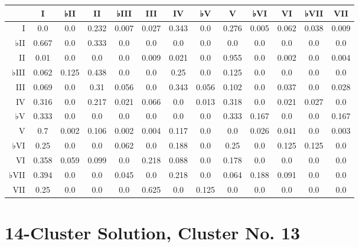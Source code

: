\begin{table}[htbp]
\begin{minipage}{\linewidth}
\setlength{\tymax}{0.5\linewidth}
\centering
\small
\begin{tabulary}{\textwidth}{@{}RCCCCCCCCCCCC@{}} \toprule
&I&♭II&II&♭III&III&IV&♭V&V&♭VI&VI&♭VII&VII\\
\midrule
I&0.0&0.0&0.232&0.007&0.027&0.343&0.0&0.276&0.005&0.062&0.038&0.009\\
♭II&0.667&0.0&0.333&0.0&0.0&0.0&0.0&0.0&0.0&0.0&0.0&0.0\\
II&0.01&0.0&0.0&0.0&0.009&0.021&0.0&0.955&0.0&0.002&0.0&0.004\\
♭III&0.062&0.125&0.438&0.0&0.0&0.25&0.0&0.125&0.0&0.0&0.0&0.0\\
III&0.069&0.0&0.31&0.056&0.0&0.343&0.056&0.102&0.0&0.037&0.0&0.028\\
IV&0.316&0.0&0.217&0.021&0.066&0.0&0.013&0.318&0.0&0.021&0.027&0.0\\
♭V&0.333&0.0&0.0&0.0&0.0&0.0&0.0&0.333&0.167&0.0&0.0&0.167\\
V&0.7&0.002&0.106&0.002&0.004&0.117&0.0&0.0&0.026&0.041&0.0&0.003\\
♭VI&0.25&0.0&0.0&0.062&0.0&0.188&0.0&0.25&0.0&0.125&0.125&0.0\\
VI&0.358&0.059&0.099&0.0&0.218&0.088&0.0&0.178&0.0&0.0&0.0&0.0\\
♭VII&0.394&0.0&0.0&0.045&0.0&0.218&0.0&0.064&0.188&0.091&0.0&0.0\\
VII&0.25&0.0&0.0&0.0&0.625&0.0&0.125&0.0&0.0&0.0&0.0&0.0\\

\bottomrule

\end{tabulary}
\end{minipage}
\end{table}

\section{14-Cluster Solution, Cluster No. 13}
\label{14-clustersolutionclusterno.13}


